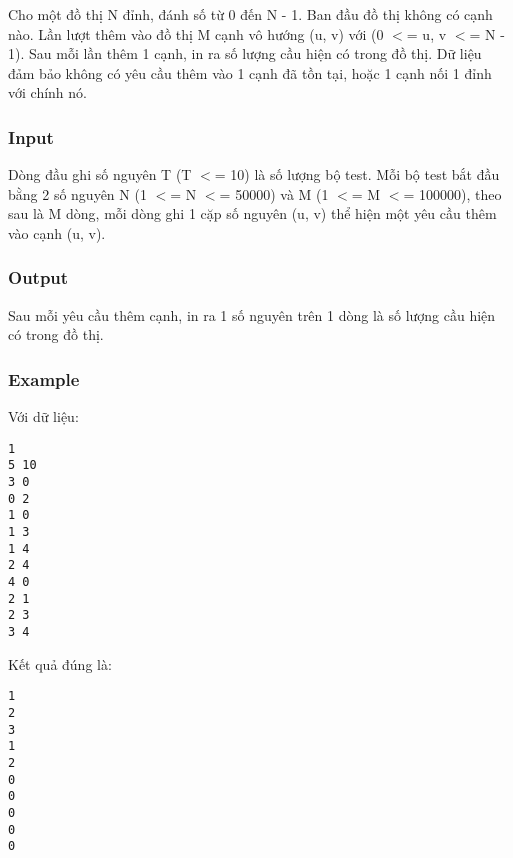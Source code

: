 







   Cho một đồ thị N đỉnh, đánh số từ 0 đến N - 1. Ban đầu đồ thị không có cạnh nào. Lần lượt thêm vào đồ thị M cạnh vô hướng (u, v) với (0 $<$= u, v $<$= N - 1). Sau mỗi lần thêm 1 cạnh, in ra số lượng cầu hiện có trong đồ thị. Dữ liệu đảm bảo không có yêu cầu thêm vào 1 cạnh đã tồn tại, hoặc 1 cạnh nối 1 đỉnh với chính nó.  

\subsubsection{   Input  }

   Dòng đầu ghi số nguyên T (T $<$= 10) là số lượng bộ test. Mỗi bộ test bắt đầu bằng 2 số nguyên N (1 $<$= N $<$= 50000) và M (1 $<$= M $<$= 100000), theo sau là M dòng, mỗi dòng ghi 1 cặp số nguyên (u, v) thể hiện một yêu cầu thêm vào cạnh (u, v).  

\subsubsection{   Output  }

   Sau mỗi yêu cầu thêm cạnh, in ra 1 số nguyên trên 1 dòng là số lượng cầu hiện có trong đồ thị.  

\subsubsection{   Example  }

   Với dữ liệu:  
\begin{verbatim}
1
5 10
3 0
0 2
1 0
1 3
1 4
2 4
4 0
2 1
2 3
3 4
\end{verbatim}

   Kết quả đúng là:  
\begin{verbatim}
1
2
3
1
2
0
0
0
0
0
\end{verbatim}

